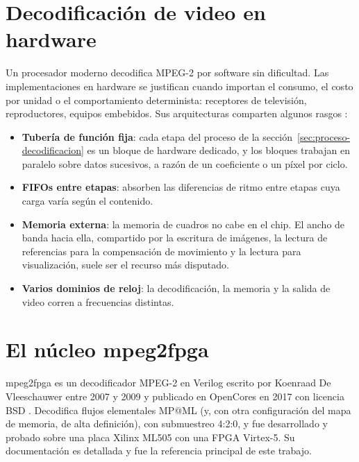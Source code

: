 \section{Decodificación de video en hardware}
\label{sec:arquitecturas-vlsi}

Un procesador moderno decodifica MPEG-2 por software sin dificultad. Las
implementaciones en hardware se justifican cuando importan el consumo, el
costo por unidad o el comportamiento determinista: receptores de televisión,
reproductores, equipos embebidos. Sus arquitecturas comparten algunos rasgos
\citep{Watkinson_2013}:

\begin{itemize}
  \item \textbf{Tubería de función fija}: cada etapa del
    proceso de la sección~\ref{sec:proceso-decodificacion} es un bloque de
    hardware dedicado, y los bloques trabajan en paralelo sobre datos
    sucesivos, a razón de un coeficiente o un píxel por ciclo.
  \item \textbf{FIFOs entre etapas}: absorben las diferencias de ritmo entre
    etapas cuya carga varía según el contenido.
  \item \textbf{Memoria externa}: la memoria de cuadros no cabe en el chip.
    El ancho de banda hacia ella, compartido por la escritura de imágenes,
    la lectura de referencias para la compensación de movimiento y la lectura
    para visualización, suele ser el recurso más disputado.
  \item \textbf{Varios dominios de reloj}: la decodificación, la memoria y
    la salida de video corren a frecuencias distintas.
\end{itemize}

\section{El núcleo mpeg2fpga}
\label{sec:mpeg2fpga}

mpeg2fpga es un decodificador MPEG-2 en Verilog escrito por Koenraad De
Vleeschauwer entre 2007 y 2009 y publicado en OpenCores en 2017 con licencia
BSD \citep{De_Vleeschauwer_2017}. Decodifica flujos elementales MP@ML (y,
con otra configuración del mapa de memoria, de alta definición), con
submuestreo 4:2:0, y fue desarrollado y probado sobre una placa Xilinx ML505
con una FPGA Virtex-5. Su documentación \citep{De_Vleeschauwer_2009_guide}
es detallada y fue la referencia principal de este trabajo.

